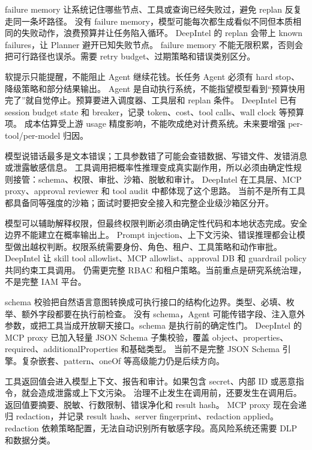 {failure memory 让系统记住哪些节点、工具或查询已经失败过，避免 replan 反复走同一条坏路径。}
{没有 failure memory，模型可能每次都生成看似不同但本质相同的失败动作，浪费预算并让任务陷入循环。}
{DeepIntel 的 replan 会带上 known failures，让 Planner 避开已知失败节点。}
{failure memory 不能无限积累，否则会把可行路径也误杀。需要 retry budget、过期策略和错误类别区分。}

{软提示只能提醒，不能阻止 Agent 继续花钱。长任务 Agent 必须有 hard stop、降级策略和部分结果输出。}
{Agent 是自动执行系统，不能指望模型看到“预算快用完了”就自觉停止。预算要进入调度器、工具层和 replan 条件。}
{DeepIntel 已有 session budget state 和 breaker，记录 token、cost、tool calls、wall clock 等预算项。}
{成本估算受上游 usage 精度影响，不能吹成绝对计费系统。未来要增强 per-tool/per-model 归因。}

{模型说错话最多是文本错误；工具参数错了可能会查错数据、写错文件、发错消息或泄露敏感信息。}
{工具调用把概率性推理变成真实副作用，所以必须由确定性规则接管：schema、权限、审批、沙箱、脱敏和审计。}
{DeepIntel 在工具层、MCP proxy、approval reviewer 和 tool audit 中都体现了这个思路。}
{当前不是所有工具都具备同等强度的沙箱；面试时要把安全接入和完整企业级沙箱区分开。}

{模型可以辅助解释权限，但最终权限判断必须由确定性代码和本地状态完成。安全边界不能建立在概率输出上。}
{Prompt injection、上下文污染、错误推理都会让模型做出越权判断。权限系统需要身份、角色、租户、工具策略和动作审批。}
{DeepIntel 让 skill tool allowlist、MCP allowlist、approval DB 和 guardrail policy 共同约束工具调用。}
{仍需更完整 RBAC 和租户策略。当前重点是研究系统治理，不是完整 IAM 平台。}

{schema 校验把自然语言意图转换成可执行接口的结构化边界。类型、必填、枚举、额外字段都要在执行前检查。}
{没有 schema，Agent 可能传错字段、注入意外参数，或把工具当成开放聊天接口。schema 是执行前的确定性门。}
{DeepIntel 的 MCP proxy 已加入轻量 JSON Schema 子集校验，覆盖 object、properties、required、additionalProperties 和基础类型。}
{当前不是完整 JSON Schema 引擎。复杂嵌套、pattern、oneOf 等高级能力仍是后续方向。}

{工具返回值会进入模型上下文、报告和审计。如果包含 secret、内部 ID 或恶意指令，就会造成泄露或上下文污染。}
{治理不止发生在调用前，还要发生在调用后。返回值要摘要、脱敏、行数限制、错误净化和 result hash。}
{MCP proxy 现在会递归 redaction，并记录 result hash、server fingerprint、redaction applied。}
{redaction 依赖策略配置，无法自动识别所有敏感字段。高风险系统还需要 DLP 和数据分类。}

